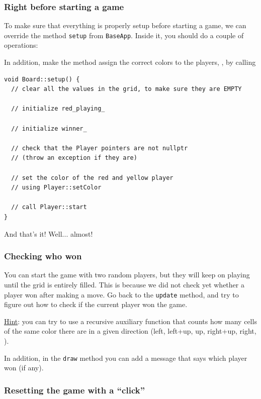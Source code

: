 \documentclass{article}
\begin{document}
\subsubsection{Right before starting a game}

To make sure that everything is properly setup before starting a game, we can override the method \texttt{setup} from \texttt{BaseApp}. Inside it, you should do a couple of operations:

In addition, make the method assign the correct colors to the players, \eg, by calling \begin{center}
\begin{minipage}{.9\textwidth}
\begin{lstlisting}[style=mycpp,numbers=none]
void Board::setup() {
  // clear all the values in the grid, to make sure they are EMPTY
  
  // initialize red_playing_
  
  // initialize winner_
  
  // check that the Player pointers are not nullptr
  // (throw an exception if they are)
  
  // set the color of the red and yellow player
  // using Player::setColor
  
  // call Player::start
}
\end{lstlisting}
\end{minipage}
\end{center}

And that's it! Well... almost!


\subsubsection{Checking who won}

You can start the game with two random players, but they will keep on playing until the grid is entirely filled. This is because we did not check yet whether a player won after making a move. Go back to the \texttt{update} method, and try to figure out how to check if the current player won the game.

\underline{Hint}: you can try to use a recursive auxiliary function that counts how many cells of the same color there are in a given direction (left, left+up, up, right+up, right, \etc).

In addition, in the \texttt{draw} method you can add a message that says which player won (if any).




\subsubsection{Resetting the game with a ``click''}
\end{document}
